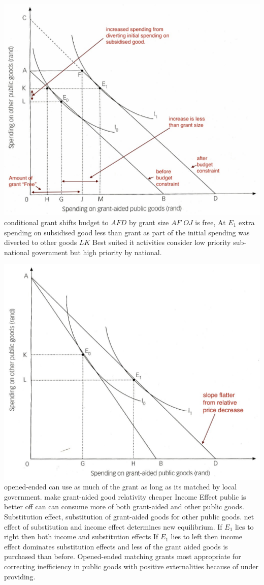 \documentclass[12pt]{examnotes}
\begin{document}
\includegraphics[scale=0.3]{./imgs/172.jpg}
\ra conditional grant shifts budget to $AFD$ by grant size $AF$
\ra $OJ$ is free, 
\ra At $E_1$ extra spending on subsidised good less than grant as part of the initial spending was diverted to other goods $LK$
\ra Best suited it activities consider low priority sub-national government but high priority by national.

\includegraphics[scale=0.3]{./imgs/173.jpg}
\ra opened-ended can use as much of the grant as long as its matched by local government.
\ra make grant-aided good relativity cheaper
 Income Effect public is better off can can consume more of both grant-aided and other public goods.
 Substitution effect, substitution of grant-aided goods for other public goods.
\ra net effect of substitution and income effect determines new equilibrium.
\ra If $E_1$ lies to right then both income and substitution effects
\ra If $E_1$ lies to left then income effect dominates substitution effects and less of the grant aided goods is purchased than before.
\ra Opened-ended matching grants most appropriate for correcting inefficiency in public goods with positive externalities because of under providing.
\end{document}
